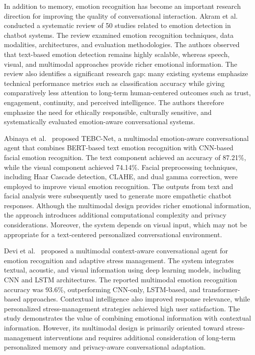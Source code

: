 \documentclass[graybox]{svmult}
\begin{document}
In addition to memory, emotion recognition has become an important research direction for improving the quality of conversational interaction. Akram et al.~\cite{Akram2026} conducted a systematic review of 50 studies related to emotion detection in chatbot systems. The review examined emotion recognition techniques, data modalities, architectures, and evaluation methodologies. The authors observed that text-based emotion detection remains highly scalable, whereas speech, visual, and multimodal approaches provide richer emotional information. The review also identifies a significant research gap: many existing systems emphasize technical performance metrics such as classification accuracy while giving comparatively less attention to long-term human-centered outcomes such as trust, engagement, continuity, and perceived intelligence. The authors therefore emphasize the need for ethically responsible, culturally sensitive, and systematically evaluated emotion-aware conversational systems.

Abinaya et al.~\cite{Abinaya2025} proposed TEBC-Net, a multimodal emotion-aware conversational agent that combines BERT-based text emotion recognition with CNN-based facial emotion recognition. The text component achieved an accuracy of 87.21\%, while the visual component achieved 74.14\%. Facial preprocessing techniques, including Haar Cascade detection, CLAHE, and dual gamma correction, were employed to improve visual emotion recognition. The outputs from text and facial analysis were subsequently used to generate more empathetic chatbot responses. Although the multimodal design provides richer emotional information, the approach introduces additional computational complexity and privacy considerations. Moreover, the system depends on visual input, which may not be appropriate for a text-centered personalized conversational environment.

Devi et al.~\cite{Devi2026} proposed a multimodal context-aware conversational agent for emotion recognition and adaptive stress management. The system integrates textual, acoustic, and visual information using deep learning models, including CNN and LSTM architectures. The reported multimodal emotion recognition accuracy was 93.6\%, outperforming CNN-only, LSTM-based, and transformer-based approaches. Contextual intelligence also improved response relevance, while personalized stress-management strategies achieved high user satisfaction. The study demonstrates the value of combining emotional information with contextual information. However, its multimodal design is primarily oriented toward stress-management interventions and requires additional consideration of long-term personalized memory and privacy-aware conversational adaptation.
\end{document}
